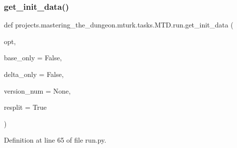 \subsubsection{\texorpdfstring{get\+\_\+init\+\_\+data()}{get\_init\_data()}}
{\footnotesize\ttfamily def projects.\+mastering\+\_\+the\+\_\+dungeon.\+mturk.\+tasks.\+M\+T\+D.\+run.\+get\+\_\+init\+\_\+data (\begin{DoxyParamCaption}\item[{}]{opt,  }\item[{}]{base\+\_\+only = {\ttfamily False},  }\item[{}]{delta\+\_\+only = {\ttfamily False},  }\item[{}]{version\+\_\+num = {\ttfamily None},  }\item[{}]{resplit = {\ttfamily True} }\end{DoxyParamCaption})}



Definition at line 65 of file run.\+py.


